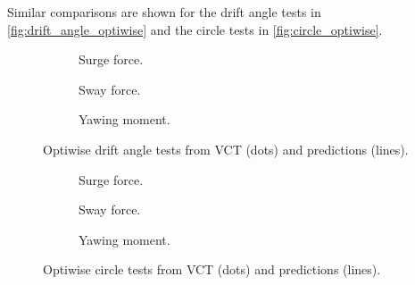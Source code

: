 Similar comparisons are shown for the drift angle tests in \autoref{fig:drift_angle_optiwise} and the circle tests in \autoref{fig:circle_optiwise}. 
\begin{figure}[h]
     \centering
     \begin{subfigure}[b]{0.32\textwidth}
         \centering
         
        \caption{Surge force.}
        \label{fig:drift_angle_X_optiwise}
     \end{subfigure}
     \hfill
     \begin{subfigure}[b]{0.32\textwidth}
         \centering
         
        \caption{Sway force.}
        \label{fig:drift_angle_Y_optiwise}
     \end{subfigure}
     \hfill
     \begin{subfigure}[b]{0.32\textwidth}
         \centering
         
        \caption{Yawing moment.}
        \label{fig:drift_angle_N_optiwise}
     \end{subfigure}
    \caption{Optiwise drift angle tests from VCT (dots) and predictions (lines).}
    \label{fig:drift_angle_optiwise}
\end{figure}
\begin{figure}[h]
     \centering
     \begin{subfigure}[b]{0.32\textwidth}
         \centering
         
        \caption{Surge force.}
        \label{fig:drift_angle_X_optiwise}
     \end{subfigure}
     \hfill
     \begin{subfigure}[b]{0.32\textwidth}
         \centering
         
        \caption{Sway force.}
        \label{fig:drift_angle_Y_optiwise}
     \end{subfigure}
     \hfill
     \begin{subfigure}[b]{0.32\textwidth}
         \centering
         
        \caption{Yawing moment.}
        \label{fig:drift_angle_N_optiwise}
     \end{subfigure}
    \caption{Optiwise circle tests from VCT (dots) and predictions (lines).}
    \label{fig:circle_optiwise}
\end{figure}
